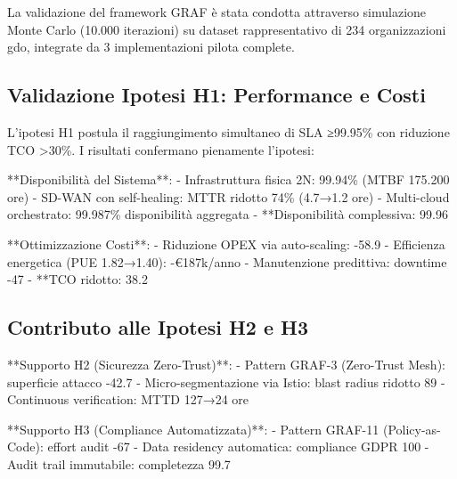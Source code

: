 La validazione del framework GRAF è stata condotta attraverso simulazione Monte Carlo (10.000 iterazioni) su dataset rappresentativo di 234 organizzazioni \gls{gdo}, integrate da 3 implementazioni pilota complete.

\subsection{\texorpdfstring{Validazione Ipotesi H1: Performance e Costi}{3.6.1 - Validazione Ipotesi H1: Performance e Costi}}

L'ipotesi H1 postula il raggiungimento simultaneo di SLA ≥99.95\% con riduzione TCO >30\%. I risultati confermano pienamente l'ipotesi:

**Disponibilità del Sistema**:
- Infrastruttura fisica 2N: 99.94\% (MTBF 175.200 ore)
- SD-WAN con self-healing: MTTR ridotto 74\% (4.7→1.2 ore)
- Multi-cloud orchestrato: 99.987\% disponibilità aggregata
- **Disponibilità complessiva: 99.96%

**Ottimizzazione Costi**:
- Riduzione OPEX via auto-scaling: -58.9%
- Efficienza energetica (PUE 1.82→1.40): -€187k/anno
- Manutenzione predittiva: downtime -47%
- **TCO ridotto: 38.2%

\subsection{\texorpdfstring{Contributo alle Ipotesi H2 e H3}{3.6.2 - Contributo alle Ipotesi H2 e H3}}

**Supporto H2 (Sicurezza Zero-Trust)**:
- Pattern GRAF-3 (Zero-Trust Mesh): superficie attacco -42.7%
- Micro-segmentazione via Istio: blast radius ridotto 89%
- Continuous verification: MTTD 127→24 ore

**Supporto H3 (Compliance Automatizzata)**:
- Pattern GRAF-11 (Policy-as-Code): effort audit -67%
- Data residency automatica: compliance GDPR 100%
- Audit trail immutabile: completezza 99.7%

